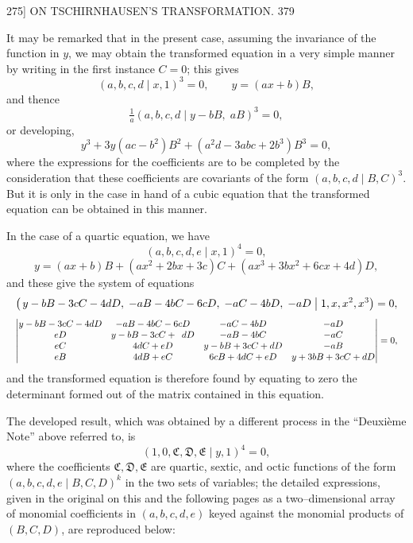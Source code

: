 \documentclass[11pt]{article}
\begin{document}
\begin{center}
\textsc{275]} \hfill ON TSCHIRNHAUSEN'S TRANSFORMATION. \hfill 379
\end{center}

It may be remarked that in the present case, assuming the invariance of the
function in $y$, we may obtain the transformed equation in a very simple manner by
writing in the first instance $C=0$; this gives
\[ (a,b,c,d \mid x,1)^{3}=0, \qquad y=(ax+b)B, \]
and thence
\[ \tfrac{1}{a}(a,b,c,d \mid y-bB,\; aB)^{3}=0, \]
or developing,
\[ y^{3}+3y(ac-b^{2})B^{2}+(a^{2}d-3abc+2b^{3})B^{3}=0, \]
where the expressions for the coefficients are to be completed by the consideration
that these coefficients are covariants of the form $(a,b,c,d \mid B,C)^{3}$. But it is only in
the case in hand of a cubic equation that the transformed equation can be obtained
in this manner.

In the case of a quartic equation, we have
\[ (a,b,c,d,e \mid x,1)^{4}=0, \]
\[ y=(ax+b)B+(ax^{2}+2bx+3c)C+(ax^{3}+3bx^{2}+6cx+4d)D, \]
and these give the system of equations
\[ \resizebox{\textwidth}{!}{$\displaystyle
\left(\,y-bB-3cC-4dD,\; -aB-4bC-6cD,\; -aC-4bD,\; -aD\;\middle|\; 1,x,x^{2},x^{3}\right)=0,
$} \]
\[ \resizebox{\textwidth}{!}{$\displaystyle
\begin{vmatrix}
y-bB-3cC-4dD & -aB-4bC-6cD & -aC-4bD & -aD \\
eD & y-bB-3cC+\phantom{0}dD & -aB-4bC & -aC \\
eC & 4dC+eD & y-bB+3cC+dD & -aB \\
eB & 4dB+eC & 6cB+4dC+eD & y+3bB+3cC+dD
\end{vmatrix}=0,
$} \]
and the transformed equation is therefore found by equating to zero the determinant
formed out of the matrix contained in this equation.

The developed result, which was obtained by a different process in the
``Deuxi\`eme Note'' above referred to, is
\[ (1,0,\mathfrak{C},\mathfrak{D},\mathfrak{E} \mid y,1)^{4}=0, \]
where the coefficients $\mathfrak{C},\mathfrak{D},\mathfrak{E}$ are quartic, sextic, and octic
functions of the form $(a,b,c,d,e\mid B,C,D)^{k}$ in the two sets of variables; the
detailed expressions, given in the original on this and the following pages as a
two--dimensional array of monomial coefficients in $(a,b,c,d,e)$ keyed against the
monomial products of $(B,C,D)$, are reproduced below:
\end{document}
